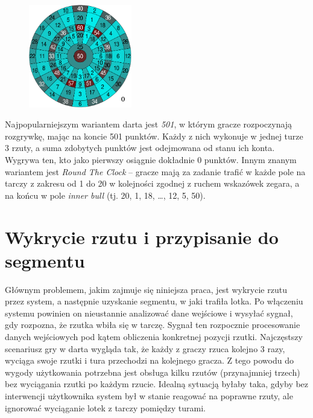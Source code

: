 \begin{figure}[h!]
\begin{center}
\includegraphics[width=0.4\textwidth]{obrazki/tarcza.pdf}
\end{center}
\label{tarcza_punktacja}
\end{figure} 

Najpopularniejszym wariantem darta jest \textit{501}, w którym gracze rozpoczynają rozgrywkę, mając na koncie 501 punktów. Każdy z nich wykonuje w jednej turze 3 rzuty, a suma zdobytych punktów jest odejmowana od stanu ich konta. Wygrywa ten, kto jako pierwszy osiągnie dokładnie 0 punktów. Innym znanym wariantem jest \textit{Round The Clock} -- gracze mają za zadanie trafić w każde pole na tarczy z zakresu od 1 do 20 w kolejności zgodnej z ruchem wskazówek zegara, a na końcu w pole \textit{inner bull} (tj. 20, 1, 18, \ldots, 12, 5, 50).

\section{Wykrycie rzutu i przypisanie do segmentu} \label{reprezentacja_pola}
Głównym problemem, jakim zajmuje się niniejsza praca, jest wykrycie rzutu przez system, a następnie uzyskanie segmentu, w jaki trafiła lotka. Po włączeniu systemu powinien on nieustannie analizować dane wejściowe i wysyłać sygnał, gdy rozpozna, że rzutka wbiła się w tarczę. Sygnał ten rozpocznie procesowanie danych wejściowych pod kątem obliczenia konkretnej pozycji rzutki. Najczęstszy scenariusz gry w darta wygląda tak, że każdy z graczy rzuca kolejno 3 razy, wyciąga swoje rzutki i tura przechodzi na kolejnego gracza. Z tego powodu do wygody użytkowania potrzebna jest obsługa kilku rzutów (przynajmniej trzech) bez wyciągania rzutki po każdym rzucie. Idealną sytuacją byłaby taka, gdyby bez interwencji użytkownika system był w stanie reagować na poprawne rzuty, ale ignorować wyciąganie lotek z tarczy pomiędzy turami.

